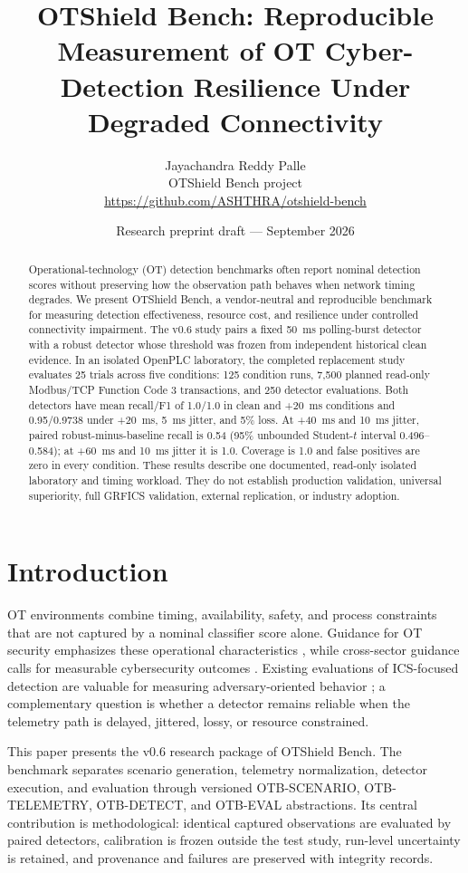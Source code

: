 \documentclass[11pt]{article}
\title{OTShield Bench: Reproducible Measurement of OT Cyber-Detection Resilience Under Degraded Connectivity}
\author{Jayachandra Reddy Palle\\OTShield Bench project\\\url{https://github.com/ASHTHRA/otshield-bench}}
\date{Research preprint draft --- September 2026}
\newcommand{\otb}{OTShield Bench}
\newcommand{\fc}{Modbus/TCP Function Code 3}
\begin{document}
\maketitle

\begin{abstract}
Operational-technology (OT) detection benchmarks often report nominal detection
scores without preserving how the observation path behaves when network timing
degrades. We present \otb, a vendor-neutral and reproducible benchmark for
measuring detection effectiveness, resource cost, and resilience under controlled
connectivity impairment. The v0.6 study pairs a fixed 50~ms polling-burst
detector with a robust detector whose threshold was frozen from independent
historical clean evidence. In an isolated OpenPLC laboratory, the completed
replacement study evaluates 25 trials across five conditions: 125 condition runs,
7,500 planned read-only \fc{} transactions, and 250 detector evaluations. Both
detectors have mean recall/F1 of 1.0/1.0 in clean and +20~ms conditions and
0.95/0.9738 under +20~ms, 5~ms jitter, and 5\% loss. At +40~ms and 10~ms jitter,
paired robust-minus-baseline recall is 0.54 (95\% unbounded Student-$t$ interval
0.496--0.584); at +60~ms and 10~ms jitter it is 1.0. Coverage is 1.0 and false
positives are zero in every condition. These results describe one documented,
read-only isolated laboratory and timing workload. They do not establish
production validation, universal superiority, full GRFICS validation, external
replication, or industry adoption.
\end{abstract}

\section{Introduction}
OT environments combine timing, availability, safety, and process constraints
that are not captured by a nominal classifier score alone. Guidance for OT
security emphasizes these operational characteristics \cite{stouffer2023ot}, while
cross-sector guidance calls for measurable cybersecurity outcomes
\cite{cisa2023cpg}. Existing evaluations of ICS-focused detection are valuable
for measuring adversary-oriented behavior \cite{mitre2021ics}; a complementary
question is whether a detector remains reliable when the telemetry path is
delayed, jittered, lossy, or resource constrained.

This paper presents the v0.6 research package of \otb. The benchmark separates
scenario generation, telemetry normalization, detector execution, and evaluation
through versioned OTB-SCENARIO, OTB-TELEMETRY, OTB-DETECT, and OTB-EVAL
abstractions. Its central contribution is methodological: identical captured
observations are evaluated by paired detectors, calibration is frozen outside the
test study, run-level uncertainty is retained, and provenance and failures are
preserved with integrity records.
\end{document}
